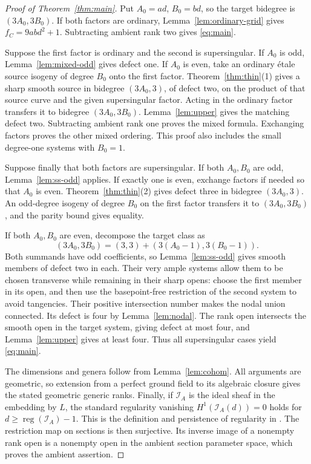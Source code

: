 \documentclass[11pt]{article}
\theoremstyle{definition}\newtheorem{definition}[theorem]{Definition}
\theoremstyle{remark}\newtheorem{remark}[theorem]{Remark}
\begin{document}
\begin{proof}[Proof of Theorem~\ref{thm:main}]
Put $A_0=ad$, $B_0=bd$, so the target bidegree is $(3A_0,3B_0)$. If both factors are ordinary, Lemma~\ref{lem:ordinary-grid} gives $f_C=9abd^2+1$. Subtracting ambient rank two gives \eqref{eq:main}.

Suppose the first factor is ordinary and the second is supersingular. If $A_0$ is odd, Lemma~\ref{lem:mixed-odd} gives defect one. If $A_0$ is even, take an ordinary \'etale source isogeny of degree $B_0$ onto the first factor. Theorem~\ref{thm:thin}(1) gives a sharp smooth source in bidegree $(3A_0,3)$, of defect two, on the product of that source curve and the given supersingular factor. Acting in the ordinary factor transfers it to bidegree $(3A_0,3B_0)$. Lemma~\ref{lem:upper} gives the matching defect two. Subtracting ambient rank one proves the mixed formula. Exchanging factors proves the other mixed ordering. This proof also includes the small degree-one systems with $B_0=1$.

Suppose finally that both factors are supersingular. If both $A_0,B_0$ are odd, Lemma~\ref{lem:ss-odd} applies. If exactly one is even, exchange factors if needed so that $A_0$ is even. Theorem~\ref{thm:thin}(2) gives defect three in bidegree $(3A_0,3)$. An odd-degree isogeny of degree $B_0$ on the first factor transfers it to $(3A_0,3B_0)$, and the parity bound gives equality.

If both $A_0,B_0$ are even, decompose the target class as
\[
               (3A_0,3B_0)=(3,3)+(3(A_0-1),3(B_0-1)).
\]
Both summands have odd coefficients, so Lemma~\ref{lem:ss-odd} gives smooth members of defect two in each. Their very ample systems allow them to be chosen transverse while remaining in their sharp opens: choose the first member in its open, and then use the basepoint-free restriction of the second system to avoid tangencies. Their positive intersection number makes the nodal union connected. Its defect is four by Lemma~\ref{lem:nodal}. The rank open intersects the smooth open in the target system, giving defect at most four, and Lemma~\ref{lem:upper} gives at least four. Thus all supersingular cases yield \eqref{eq:main}.

The dimensions and genera follow from Lemma~\ref{lem:cohom}. All arguments are geometric, so extension from a perfect ground field to its algebraic closure gives the stated geometric generic ranks. Finally, if $\mathcal I_A$ is the ideal sheaf in the embedding by $L$, the standard regularity vanishing $H^1(\mathcal I_A(d))=0$ holds for $d\ge\operatorname{reg}(\mathcal I_A)-1$. This is the definition and persistence of regularity in \citet[Definition~33.35.7 and Lemma~33.35.10]{Stacks}. The restriction map on sections is then surjective. Its inverse image of a nonempty rank open is a nonempty open in the ambient section parameter space, which proves the ambient assertion.
\end{proof}
\end{document}
